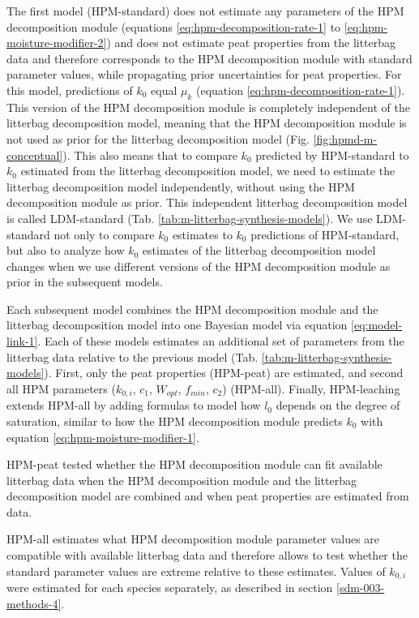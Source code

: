 \documentclass[esd, manuscript]{copernicus}
\begin{document}
The first model (HPM-standard) does not estimate any parameters of the HPM decomposition module (equations \eqref{eq:hpm-decomposition-rate-1} to \eqref{eq:hpm-moisture-modifier-2}) and does not estimate peat properties from the litterbag data and therefore corresponds to the HPM decomposition module with standard parameter values, while propagating prior uncertainties for peat properties. For this model, predictions of \(k_0\) equal \(\mu_k\) (equation \eqref{eq:hpm-decomposition-rate-1}). This version of the HPM decomposition module is completely independent of the litterbag decomposition model, meaning that the HPM decomposition module is not used as prior for the litterbag decomposition model (Fig. \ref{fig:hpmd-m-conceptual}). This also means that to compare \(k_0\) predicted by HPM-standard to \(k_0\) estimated from the litterbag decomposition model, we need to estimate the litterbag decomposition model independently, without using the HPM decomposition module as prior. This independent litterbag decomposition model is called LDM-standard (Tab. \ref{tab:m-litterbag-synthesis-models}). We use LDM-standard not only to compare \(k_0\) estimates to \(k_0\) predictions of HPM-standard, but also to analyze how \(k_0\) estimates of the litterbag decomposition model changes when we use different versions of the HPM decomposition module as prior in the subsequent models.

Each subsequent model combines the HPM decomposition module and the litterbag decomposition model into one Bayesian model via equation \eqref{eq:model-link-1}. Each of these models estimates an additional set of parameters from the litterbag data relative to the previous model (Tab. \ref{tab:m-litterbag-synthesis-models}). First, only the peat properties (HPM-peat) are estimated, and second all HPM parameters (\(k_{0,i}\), \(c_1\), \(W_{opt}\), \(f_{min}\), \(c_2\)) (HPM-all). Finally, HPM-leaching extends HPM-all by adding formulas to model how \(l_0\) depends on the degree of saturation, similar to how the HPM decomposition module predicts \(k_0\) with equation \eqref{eq:hpm-moisture-modifier-1}.

HPM-peat tested whether the HPM decomposition module can fit available litterbag data when the HPM decomposition module and the litterbag decomposition model are combined and when peat properties are estimated from data.

HPM-all estimates what HPM decomposition module parameter values are compatible with available litterbag data and therefore allows to test whether the standard parameter values are extreme relative to these estimates. Values of \(k_{0,i}\) were estimated for each species separately, as described in section \ref{sdm-003-methods-4}.
\end{document}

